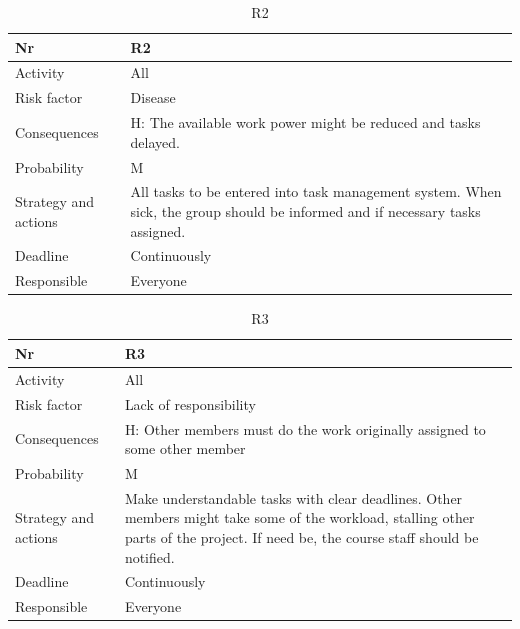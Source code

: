 \documentclass[11pt]{book}
\begin{document}
\begin{table}[H]
\centering
\begin{tabular}{ l  p{11cm} }
	Nr						& R2 																		\\ \hline
	Activity				& All 																		\\ \hline
	Risk factor				& Disease 																	\\ \hline
	Consequences			& H: The available work power might be reduced and tasks delayed. 			\\ \hline
	Probability				& M 																		\\ \hline
	Strategy and actions	& All tasks to be entered into task management system. 
							  When sick, the group should be informed and if necessary tasks assigned.	\\ \hline
	Deadline				& Continuously 																\\ \hline
	Responsible				& Everyone\\
\end{tabular}
\label{tab:risk_2}
\caption{R2}
\end{table}

\begin{table}[H]
\centering
\begin{tabular}{ l  p{11cm} }
	Nr						& R3 																		\\ \hline
	Activity				& All 																		\\ \hline
	Risk factor				& Lack of responsibility 													\\ \hline
	Consequences			& H: Other members must do the work originally assigned to some other member\\ \hline
	Probability				& M 																		\\ \hline
	Strategy and actions	& Make understandable tasks with clear deadlines. Other members might take 
								some of the workload, stalling other parts of the project. If need be, 
								the course staff should be notified. 									\\ \hline
	Deadline				& Continuously 																\\ \hline
	Responsible				& Everyone 																	\\ 
\end{tabular}
\label{tab:risk_3}
\caption{R3}
\end{table}
\end{document}
